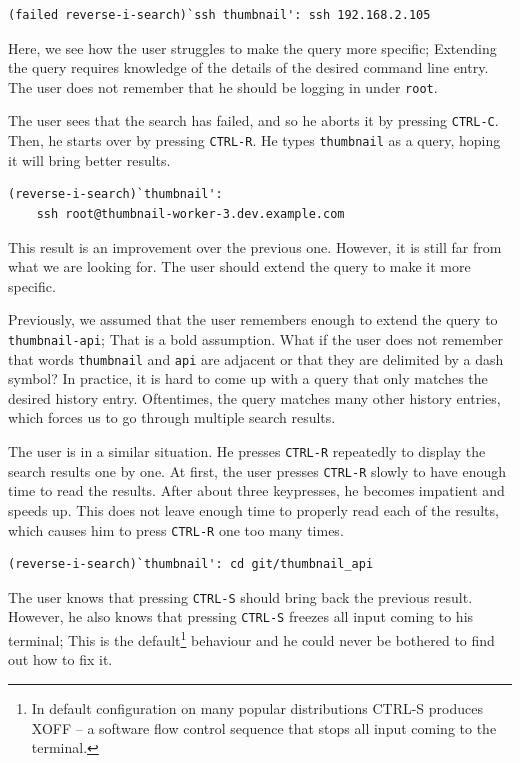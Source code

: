 \begin{verbatim}
(failed reverse-i-search)`ssh thumbnail': ssh 192.168.2.105
\end{verbatim}

Here, we see how the user struggles to make the query more specific; Extending the query requires knowledge of the details of the desired command line entry. The user does not remember that he should be logging in under \verb|root|. %

The user sees that the search has failed, and so he aborts it by pressing \verb|CTRL-C|. Then, he starts over by pressing \verb|CTRL-R|. He types \verb|thumbnail| as a query, hoping it will bring better results.


\begin{verbatim}
(reverse-i-search)`thumbnail':
    ssh root@thumbnail-worker-3.dev.example.com
\end{verbatim}

This result is an improvement over the previous one. However, it is still far from what we are looking for. The user should extend the query to make it more specific. 

Previously, we assumed that the user remembers enough to extend the query to \verb|thumbnail-api|; That is a bold assumption. What if the user does not remember that words \verb|thumbnail| and \verb|api| are adjacent or that they are delimited by a dash symbol? In practice, it is hard to come up with a query that only matches the desired history entry. Oftentimes, the query matches many other history entries, which forces us to go through multiple search results.


The user is in a similar situation. He presses \verb|CTRL-R| repeatedly to display the search results one by one. At first, the user presses \verb|CTRL-R| slowly to have enough time to read the results. After about three keypresses, he becomes impatient and speeds up. This does not leave enough time to properly read each of the results, which causes him to press \verb|CTRL-R| one too many times.

\begin{verbatim}
(reverse-i-search)`thumbnail': cd git/thumbnail_api
\end{verbatim}

The user knows that pressing \verb|CTRL-S| should bring back the previous result. However, he also knows that pressing \verb|CTRL-S| freezes all input coming to his terminal; This is the default\footnote{In default configuration on many popular distributions CTRL-S produces XOFF -- a software flow control sequence that stops all input coming to the terminal.} behaviour and he could never be bothered to find out how to fix it.

